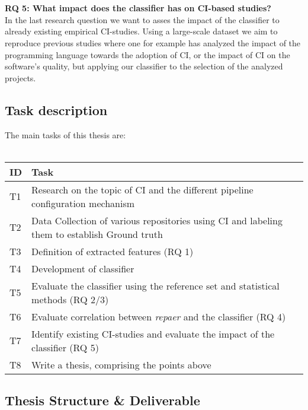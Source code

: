 \documentclass{task_description}
\begin{document}
\\\\
\textbf{RQ 5: What impact does the classifier has on CI-based studies?}\\
In the last research question we want to asses the impact of the classifier to already existing empirical CI-studies. Using a large-scale dataset we aim to reproduce previous studies where one for example has analyzed the impact of the programming language towards the adoption of CI, or the impact of CI on the software's quality, but applying our classifier to the selection of the analyzed projects. 
\newpage
\subsection*{Task description}

The main tasks of this thesis are:
\\\\
\bgroup
\def\arraystretch{1.1}%
\begin{tabular}{lp{10cm}}  
 ID & Task \\
\hline\noalign{\smallskip}
 T1 & Research on the topic of CI and the different pipeline configuration mechanism \\
 T2 & Data Collection of various repositories using CI and labeling them to establish Ground truth \\
 T3 & Definition of extracted features (RQ 1)\\
 T4 & Development of classifier\\
 T5 & Evaluate the classifier using the reference set and statistical methods (RQ 2/3)\\
 T6 & Evaluate correlation between \textit{repaer} and the classifier (RQ 4)\\
 T7 & Identify existing CI-studies and evaluate the impact of the classifier (RQ 5)\\
 T8 & Write a thesis, comprising the points above\\
\hline
\end{tabular}
\egroup

\subsection*{Thesis Structure \& Deliverable}
\end{document}
